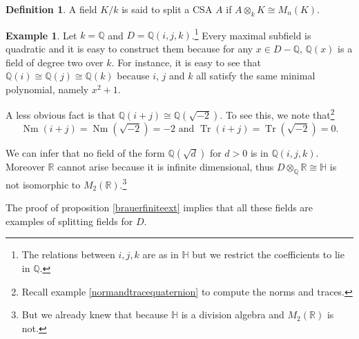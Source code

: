 \documentclass{tufte-handout} %
\theoremstyle{definition}
\newtheorem{defn}[thm]{Definition}
\newtheorem{exmp}[thm]{Example}
\theoremstyle{remark}
\newcommand{\R}{\mathbb{R}}
\newcommand{\Q}{\mathbb{Q}}
\newcommand{\bH}{\mathbb{H}}
\DeclareMathOperator{\Tr}{Tr}
\DeclareMathOperator{\Nm}{Nm}
\begin{document}
\begin{defn}
	A field $K/k$ is said to split a CSA $A$ if $A \otimes_k K \cong M_n(K)$.
\end{defn}
\begin{exmp}
	Let $k = \Q$ and $D = \Q(i,j,k)$.\footnote{The relations between $i,j,k$ are as in $\bH$ but we restrict the coefficients to lie in $\Q$.} Every maximal subfield is quadratic and it is easy to construct them because for any $x \in D-\Q$, $\Q(x)$ is a field of degree two over $k$. For instance, it is easy to see that $\Q(i) \cong \Q(j) \cong \Q(k)$ because $i$, $j$ and $k$ all satisfy the same minimal polynomial, namely $x^2+1$.
	
	A less obvious fact is that $\Q(i+j) \cong \Q(\sqrt{-2})$. To see this, we note that\footnote{Recall example \ref{normandtracequaternion} to compute the norms and traces.} \[\Nm(i+j) = \Nm(\sqrt{-2}) = -2 \text{ and } \Tr(i+j) = \Tr(\sqrt{-2}) = 0.\] 
			
	We can infer that no field of the form $\Q(\sqrt{d})$ for $d > 0$ is in $\Q(i,j,k)$. Moreover $\R$ cannot arise because it is infinite dimensional, thus $D \otimes_{\Q} \R \cong \bH$ is not isomorphic to $M_2(\R)$.\footnote{But we already knew that because $\bH$ is a division algebra and $M_2(\R)$ is not.}
	
	The proof of proposition \ref{brauerfiniteext} implies that all these fields are examples of splitting fields for $D$.	
\end{exmp}
\end{document}
